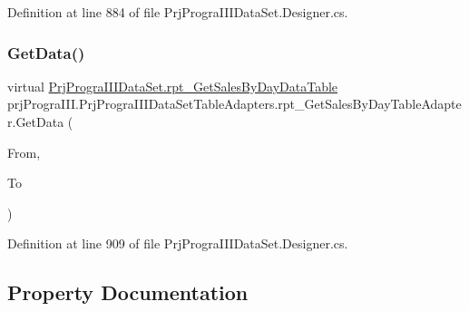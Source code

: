 Definition at line 884 of file Prj\+Progra\+I\+I\+I\+Data\+Set.\+Designer.\+cs.

\hypertarget{classprj_progra_i_i_i_1_1_prj_progra_i_i_i_data_set_table_adapters_1_1rpt___get_sales_by_day_table_adapter_a9176f2231efa36d9c98d61c351fce2cb}{}\label{classprj_progra_i_i_i_1_1_prj_progra_i_i_i_data_set_table_adapters_1_1rpt___get_sales_by_day_table_adapter_a9176f2231efa36d9c98d61c351fce2cb} 
\subsubsection{\texorpdfstring{Get\+Data()}{GetData()}}
{\footnotesize\ttfamily virtual \hyperlink{classprj_progra_i_i_i_1_1_prj_progra_i_i_i_data_set_1_1rpt___get_sales_by_day_data_table}{Prj\+Progra\+I\+I\+I\+Data\+Set.\+rpt\+\_\+\+Get\+Sales\+By\+Day\+Data\+Table} prj\+Progra\+I\+I\+I.\+Prj\+Progra\+I\+I\+I\+Data\+Set\+Table\+Adapters.\+rpt\+\_\+\+Get\+Sales\+By\+Day\+Table\+Adapter.\+Get\+Data (\begin{DoxyParamCaption}\item[{global\+::\+System.\+Nullable$<$ global\+::\+System.\+Date\+Time $>$}]{From,  }\item[{global\+::\+System.\+Nullable$<$ global\+::\+System.\+Date\+Time $>$}]{To }\end{DoxyParamCaption})\hspace{0.3cm}{\ttfamily [virtual]}}



Definition at line 909 of file Prj\+Progra\+I\+I\+I\+Data\+Set.\+Designer.\+cs.



\subsection{Property Documentation}
\hypertarget{classprj_progra_i_i_i_1_1_prj_progra_i_i_i_data_set_table_adapters_1_1rpt___get_sales_by_day_table_adapter_a205d6495861bb5c2b5508b803b8fea24}{}\label{classprj_progra_i_i_i_1_1_prj_progra_i_i_i_data_set_table_adapters_1_1rpt___get_sales_by_day_table_adapter_a205d6495861bb5c2b5508b803b8fea24} 

